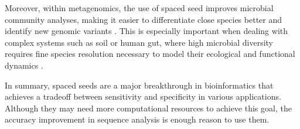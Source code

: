 	Moreover, within metagenomics, the use of spaced seed improves microbial community analyses, making it easier to differentiate close species better and identify new genomic variants \cite{burkhardt2006enhanced}. This is especially important when dealing with complex systems such as soil or human gut, where high microbial diversity requires fine species resolution necessary to model their ecological and functional dynamics \cite{turnbaugh2007human}.
	
	In summary, spaced seeds are a major breakthrough in bioinformatics that a\-chie\-ves a tradeoff between sensitivity and specificity in various applications. Although they may need more computational resources to achieve this goal, the accuracy improvement in sequence analysis is enough reason to use them.

